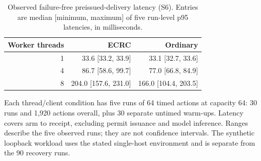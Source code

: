 \begin{table}[!htbp]
\centering
\small
\setlength{\tabcolsep}{7pt}
\renewcommand{\arraystretch}{1.15}
\caption{Observed failure-free preissued-delivery latency (S6). Entries are median [minimum, maximum] of five run-level p95 latencies, in milliseconds.}
\label{tab:delivery-cost}
\begin{tabular}{@{}rrr@{}}
\toprule
Worker threads & ECRC & Ordinary\\
\midrule
1 & 33.6 [33.2, 33.9] & 33.1 [32.7, 33.6]\\
4 & 86.7 [58.6, 99.7] & 77.0 [66.8, 84.9]\\
8 & 204.0 [157.6, 231.0] & 166.0 [104.4, 203.5]\\
\bottomrule
\end{tabular}
\par\smallskip
\begin{minipage}{\linewidth}\small
Each thread/client condition has five runs of 64 timed actions at capacity 64: 30 runs and 1,920 actions overall, plus 30 separate untimed warm-ups. Latency covers arm to receipt, excluding permit issuance and model inference. Ranges describe the five observed runs; they are not confidence intervals. The synthetic loopback workload uses the stated single-host environment and is separate from the 90 recovery runs.
\end{minipage}
\end{table}
